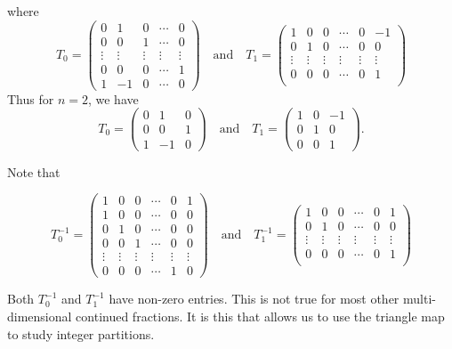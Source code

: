 \documentclass[12pt,oneside,openany]{article}
\begin{document}
  
  where
\[
    T_0 = \begin{pmatrix} 0 & 1 & 0  & \cdots & 0\\ 0 & 0 & 1 & \cdots & 0 \\  \vdots & \vdots & \vdots &\vdots & \vdots    \\0 & 0 & 0 & \cdots & 1  \\1 & -1 &
        0 & \cdots & 0 \end{pmatrix}
    \quad\text{and}\quad T_1= \begin{pmatrix} 1 & 0 & 0  & \cdots &  0 & -1\\ 0 & 1 &0&   \cdots &  0 & 0 \\  \vdots & \vdots & \vdots &\vdots & \vdots & \vdots  \\ 0 & 0 & 0 & \cdots & 0 & 1  \\\end{pmatrix}\]
Thus for $n=2$, we have 
\[
    T_0 = \begin{pmatrix} 0 & 1 & 0 \\ 0 & 0 & 1 \\ 1 & -1 &
        0 \end{pmatrix}
    \quad\text{and}\quad T_1= \begin{pmatrix} 1 & 0 & -1 \\ 0 & 1 & 0
        \\ 0&0&1 \end{pmatrix}.
\]

Note that 

\[
  T_0^{-1} =
    \begin{pmatrix}
        1 & 0 & 0&  \cdots & 0 &1 \\
        1 & 0 & 0 & \cdots & 0 & 0 \\ 0 &1&  0 &\cdots & 0 & 0 \\ 0&0&1& \cdots & 0 & 0\\
   \vdots & \vdots & \vdots &\vdots & \vdots & \vdots  \\
        0 & 0 & 0 & \cdots & 1 & 0\end{pmatrix} \quad\text{and}\quad
  T_1^{-1}= \begin{pmatrix} 1 & 0 & 0  & \cdots &  0 & 1\\ 0 & 1 &0&   \cdots &  0 & 0 \\ \vdots & \vdots & \vdots &\vdots & \vdots & \vdots \\ 0 & 0 & 0 & \cdots & 0 & 1  \\\end{pmatrix}
\]

Both  $T_0^{-1}$ and $T_1^{-1}$ have non-zero entries.  This is not true for most other multi-dimensional continued fractions.  It is this that allows us to use the triangle map to study integer partitions. 
\end{document}
